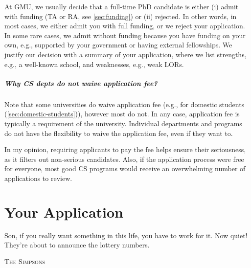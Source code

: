 \documentclass[oneside,11pt]{book}
\newenvironment{commentbox}[1][]{
  \small
  \begin{mybox}
    {\small \textbf{#1}}
  }{
  \end{mybox}
}
\newcommand{\mycomment}[3][\color{blue}]{{#1{{#2}: {#3}}}}
\newcommand{\didi}[1]{\mycomment{Didier}{#1}}{}
\begin{document}
At GMU, we usually decide that a full-time PhD candidate is either (i) admit with funding (TA or RA, see \autoref{sec:funding}) or (ii) rejected. In other words, in most cases, we either
admit you with full funding, or we reject your application. In some rare cases, we admit
without funding because you have funding on your own, e.g.,
supported by your government or having external fellowships. We justify
our decision with a summary of your application, where we list
strengths, e.g., a well-known school, and weaknesses, e.g., weak
LORs.



\paragraph{Why CS depts do not waive application fee?}  Note that some universities do waive application fee (e.g., for domestic students (\autoref{sec:domestic-students})), however most do not.  In any case, application fee is typically a requirement of the university. Individual departments and programs do not have the flexibility to waive the application fee, even if they want to. 

In my opinion, requiring applicants to pay the fee helps ensure their seriousness, as it filters out non-serious candidates. Also, if the application process were free for everyone, most good CS programs would receive an overwhelming number of applications to review.




\chapter{Your Application}\label{sec:application}

\epigraph{Son, if you really want something in this life, you have to work for it. Now quiet! They’re about to announce the lottery numbers.}{\textsc{The Simpsons}}
\end{document}
